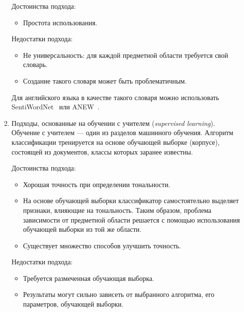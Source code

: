 \begin{enumerate}
Достоинства подхода:
\begin{itemize}

	\item 
	Простота использования. 

\end{itemize}

Недостатки подхода:
\begin{itemize}

	\item 
	Не универсальность: для каждой предметной области требуется свой словарь. 

	\item
	Создание такого словаря может быть проблематичным.

\end{itemize} 

Для английского языка в качестве такого словаря можно использовать SentiWordNet~\cite{sentiwordnet} или ANEW~\cite{anew}.

\item 
Подходы, основанные на обучении с учителем (\textit{supervised learning}). 
Обучение с учителем --- один из разделов машинного обучения. Алгоритм 
классификации тренируется на основе обучающей выборке (корпусе), состоящей 
из документов, классы которых заранее известны. 

Достоинства подхода:
\begin{itemize}
	
	\item
	Хорошая точность при определении тональности.

	\item
	На основе обучающей выборки классификатор самостоятельно выделяет 
	признаки, влияющие на тональность. 
	Таким образом, проблема зависимости от предметной области решается 
	с помощью использования обучающей выборки из той же области. 

	\item
	Существует множество способов улучшить точность.

\end{itemize}

Недостатки подхода:
\begin{itemize}

	\item
	Требуется размеченная обучающая выборка.

	\item
	Результаты могут сильно зависеть от выбранного алгоритма, его параметров, 
	обучающей выборки.


\end{itemize}
\end{enumerate}

